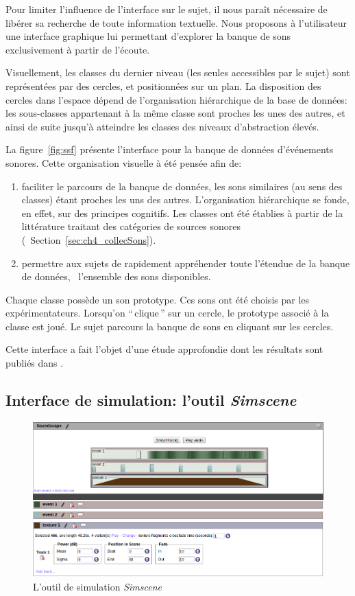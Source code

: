 Pour limiter l’influence de l’interface sur le sujet, il nous paraît nécessaire de libérer sa recherche de toute information textuelle. Nous proposons à l'utilisateur une interface graphique lui permettant d’explorer la banque de sons exclusivement à partir de l’écoute.

Visuellement, les classes du dernier niveau (les seules accessibles par le sujet) sont représentées par des cercles, et positionnées sur un plan. La disposition des cercles dans l'espace dépend de l’organisation hiérarchique de la base de données: les sous-classes appartenant à la même classe sont proches les unes des autres, et ainsi de suite jusqu'à atteindre les classes des niveaux d'abstraction élevés.

La figure~\ref{fig:ssf} présente l'interface pour la banque de données d'événements sonores. Cette organisation visuelle à été pensée afin de:

\begin{enumerate}
\item faciliter le parcours de la banque de données, les sons similaires (au sens des classes) étant proches les uns des autres. L'organisation hiérarchique se fonde, en effet, sur des principes cognitifs. Les classes ont été établies à partir de la littérature traitant des catégories de sources sonores (\cf~Section~\ref{sec:ch4_collecSons}).
\item permettre aux sujets de rapidement appréhender toute l'étendue de la banque de données, \ie~l'ensemble des sons disponibles.
\end{enumerate}

Chaque classe possède un son prototype. Ces sons ont été choisis par les expérimentateurs. Lorsqu’on ``\,clique\,'' sur un cercle, le prototype associé à la classe est joué. Le sujet parcours la banque de sons en cliquant sur les cercles.

Cette interface a fait l'objet d'une étude approfondie dont les résultats sont publiés dans \citep{lafay2016JAES}. \\


\subsection{Interface de simulation: l'outil \emph{Simscene}}
\label{sec:ch4_simscene}

\begin{figure}[t]
        \myfloatalign
        \includegraphics[width=.8\linewidth]{gfx/simscene}
       \caption{L'outil de simulation \emph{Simscene}}\label{fig:simscene}
\end{figure}

